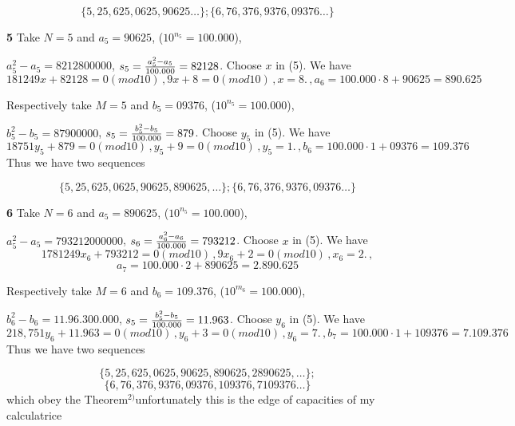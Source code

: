                               $$
                               \{5,25,625, 0625,90625\dots\};
                               \{6,76,376, 9376,09376\dots\}
                                $$


\medskip
  
        
{\bf 5}
  Take $N=5$ and $a_5=90625$, ($10^{n_5}=100 .000$),

 $a_5^2-a_5=8212800000$, $s_5={a_5^2-a_5\over 100.000}=82128$. Choose $x$ in (5).  We have
                                   $$
181249x+82128=0(mod10)\,,9x+8=0(mod10)\,,x=8.\,,
a_6=100.000\cdot 8+90625=890.625
                                           $$

 Respectively take $M=5$ and $b_5=09376$, ($10^{n_5}=100 .000$),

 $b_5^2-b_5=87900000$, $s_5={b_5^2-b_5\over 100.000}=879$. 
 Choose $y_5$ in (5).  We have
                                   $$
18751y_5+879=0(mod10)\,,y_5+9=0(mod10)\,,y_5=1.\,,
b_6=100.000\cdot 1+09376=109.376
                     $$
Thus we have two sequences



                               $$
                               \{5,25,625, 0625,90625,890625,\dots\};
                               \{6,76,376, 9376,09376\dots\}
                                $$


\medskip

{\bf 6}
Take $N=6$ and $a_5=890625$, ($10^{n_5}=100 .000$),

 $a_5^2-a_5=793212000000$, $s_6={a_6^2-a_6\over 100.000}=793212$. 
 Choose $x$ in (5).  We have
                                   $$
1781249x_6+793212=0(mod10)\,,9x_6+2=0(mod10)\,,x_6=2.\,,
                     $$
                      $$
a_7=100.000\cdot 2+890625=2.890.625
                         $$

 Respectively take $M=6$ and $b_6=109.376$, ($10^{m_6}=100 .000$),

 $b_6^2-b_6=11.96.300.000$, $s_5={b_5^2-b_5\over 100.000}=11.963$. 
 Choose $y_6$ in (5).  We have
                                   $$
218,751y_6+11.963=0(mod10)\,,y_6+3=0(mod10)\,,y_6=7.\,,
b_7=100.000\cdot 1+109376=7  . 109.376
$$
Thus we have two sequences



                               $$
                          \{5,25,625, 0625,90625,890625,2890625,\dots\};
                                     $$
                                     $$
                          \{6,76,376, 9376,09376,109376,7109376\dots\}
                                $$
    which obey the Theorem{$^{2)}$}{unfortunately this is
    the edge of capacities of my calculatrice}                     


 \bye
